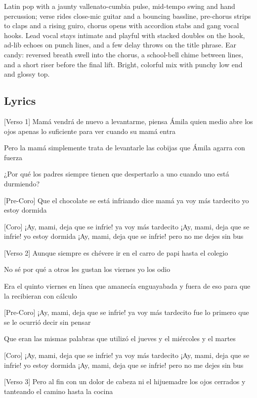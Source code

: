 Latin pop with a jaunty vallenato-cumbia pulse, mid-tempo swing and hand
percussion; verse rides close-mic guitar and a bouncing bassline,
pre-chorus strips to claps and a rising guiro, chorus opens with
accordion stabs and gang vocal hooks. Lead vocal stays intimate and
playful with stacked doubles on the hook, ad-lib echoes on punch lines,
and a few delay throws on the title phrase. Ear candy: reversed breath
swell into the chorus, a school-bell chime between lines, and a short
riser before the final lift. Bright, colorful mix with punchy low end
and glossy top.

\subsection{Lyrics}\label{lyrics-34}

{[}Verso 1{]} Mamá vendrá de nuevo a levantarme, piensa Ámila quien
medio abre los ojos apenas lo suficiente para ver cuando su mamá entra

Pero la mamá simplemente trata de levantarle las cobijas que Ámila
agarra con fuerza

¿Por qué los padres siempre tienen que despertarlo a uno cuando uno está
durmiendo?

{[}Pre-Coro{]} Que el chocolate se está infriando dice mamá ya voy más
tardecito yo estoy dormida

{[}Coro{]} ¡Ay, mami, deja que se infrie! ya voy más tardecito ¡Ay,
mami, deja que se infrie! yo estoy dormida ¡Ay, mami, deja que se
infrie! pero no me dejes sin bus

{[}Verso 2{]} Aunque siempre es chévere ir en el carro de papi hasta el
colegio

No sé por qué a otros les gustan los viernes yo los odio

Era el quinto viernes en línea que amanecía enguayabada y fuera de eso
para que la recibieran con cálculo

{[}Pre-Coro{]} ¡Ay, mami, deja que se infrie! ya voy más tardecito fue
lo primero que se le ocurrió decir sin pensar

Que eran las mismas palabras que utilizó el jueves y el miércoles y el
martes

{[}Coro{]} ¡Ay, mami, deja que se infrie! ya voy más tardecito ¡Ay,
mami, deja que se infrie! yo estoy dormida ¡Ay, mami, deja que se
infrie! pero no me dejes sin bus

{[}Verso 3{]} Pero al fin con un dolor de cabeza ni el hijuemadre los
ojos cerrados y tanteando el camino hasta la cocina

